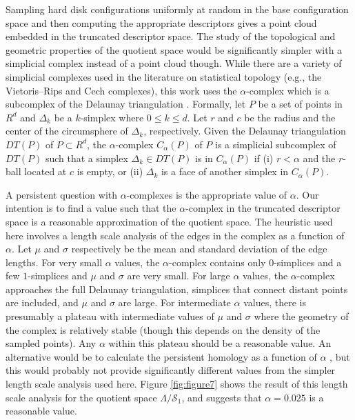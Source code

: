 \documentclass[default,iicol]{sn-jnl}%
\theoremstyle{thmstyleone}%
\theoremstyle{thmstyletwo}%
\theoremstyle{thmstylethree}%
\begin{document}
Sampling hard disk configurations uniformly at random in the base configuration space and then computing the appropriate descriptors gives a point cloud embedded in the truncated descriptor space. The study of the topological and geometric properties of the quotient space would be significantly simpler with a simplicial complex instead of a point cloud though. While there are a variety of simplicial complexes used in the literature on statistical topology (e.g., the Vietoris--Rips \cite{vietoris1927hoheren} and Cech \cite{hatcher2002algebraic} complexes), this work uses the $\alpha$-complex \cite{edelsbrunner1983shape} which is a subcomplex of the Delaunay triangulation \cite{delaunay1934sphere}. Formally, let $P$ be a set of points in $R^d$ and $\Delta_k$ be a $k$-simplex where $0 \leq k \leq d$. Let $r$ and $c$ be the radius and the center of the circumsphere of $\Delta_k$, respectively. Given the Delaunay triangulation $DT(P)$ of $P \subset R^d$, the $\alpha$-complex $C_\alpha(P)$ of $P$ is a simplicial subcomplex of $DT(P)$ such that a simplex $\Delta_k \in DT(P)$ is in $C_\alpha(P)$ if (i) $r<\alpha$ and the $r$-ball located at $c$ is empty, or (ii) $\Delta_k$ is a face of another simplex in $C_\alpha(P)$.

A persistent question with $\alpha$-complexes is the appropriate value of $\alpha$. Our intention is to find a value such that the $\alpha$-complex in the truncated descriptor space is a reasonable approximation of the quotient space. The heuristic used here involves a length scale analysis of the edges in the complex as a function of $\alpha$. Let $\mu$ and $\sigma$ respectively be the mean and standard deviation of the edge lengths. For very small $\alpha$ values, the $\alpha$-complex contains only $0$-simplices and a few $1$-simplices and $\mu$ and $\sigma$ are very small. For large $\alpha$ values, the $\alpha$-complex approaches the full Delaunay triangulation, simplices that connect distant points are included, and $\mu$ and $\sigma$ are large. For intermediate $\alpha$ values, there is presumably a plateau with intermediate values of $\mu$ and $\sigma$ where the geometry of the complex is relatively stable (though this depends on the density of the sampled points). Any $\alpha$ within this plateau should be a reasonable value. An alternative would be to calculate the persistent homology as a function of $\alpha$ \cite{edelsbrunner2008persistent}, but this would probably not provide significantly different values from the simpler length scale analysis used here. Figure \ref{fig:figure7} shows the result of this length scale analysis for the quotient space $\Lambda/\mathcal{S}_1$, and suggests that $\alpha = 0.025$ is a reasonable value.
\end{document}
